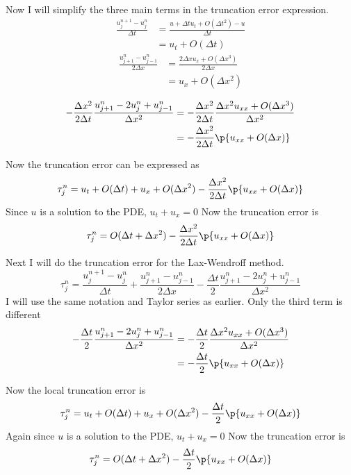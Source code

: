 \documentclass[11pt, oneside]{article}
\begin{document}
\begin{enumerate}
    Now I will simplify the three main terms in the truncation error expression.
    \begin{align*}
      \frac{u_j^{n+1} - u_j^n}{\Delta t} &= \frac{u + \Delta t u_t + O(\Delta t^2) - u}{\Delta t} \\
      &= u_t + O(\Delta t)
    \end{align*}
    \begin{align*}
      \frac{u_{j+1}^n - u_{j-1}^n}{2\Delta x} &= \frac{2\Delta x u_x + O(\Delta x^3)}{2\Delta x} \\
      &= u_x + O(\Delta x^2) \\
    \end{align*}
    \begin{align*}
      -\frac{\Delta x^2}{2 \Delta t} \frac{u_{j+1}^n - 2u_j^n + u_{j-1}^n}{\Delta x^2} &= -\frac{\Delta x^2}{2 \Delta t} \frac{\Delta x^2 u_{xx} + O(\Delta x^3)}{\Delta x^2} \\
      &= -\frac{\Delta x^2}{2 \Delta t} \p{u_{xx} + O(\Delta x)} \\
    \end{align*}

    Now the truncation error can be expressed as
    \[
      \tau_j^n = u_t + O(\Delta t) + u_x + O(\Delta x^2) - \frac{\Delta x^2}{2 \Delta t} \p{u_{xx} + O(\Delta x)}
    \]
    Since $u$ is a solution to the PDE, $u_t + u_x = 0$
    Now the truncation error is
    \[
      \tau_j^n =  O(\Delta t + \Delta x^2) - \frac{\Delta x^2}{2 \Delta t} \p{u_{xx} + O(\Delta x)}
    \]

    Next I will do the truncation error for the Lax-Wendroff method.
    \[
      \tau_j^n = \frac{u_j^{n+1} - u_j^n}{\Delta t}
      + \frac{u_{j+1}^n - u_{j-1}^n}{2\Delta x}
      - \frac{\Delta t}{2} \frac{u_{j+1}^n - 2u_j^n + u_{j-1}^n}{\Delta x^2}
    \]
    I will use the same notation and Taylor series as earlier.
    Only the third term is different
    \begin{align*}
      -\frac{\Delta t}{2} \frac{u_{j+1}^n - 2u_j^n + u_{j-1}^n}{\Delta x^2} &= -\frac{\Delta t}{2} \frac{\Delta x^2 u_{xx} + O(\Delta x^3)}{\Delta x^2} \\
      &= -\frac{\Delta t}{2} \p{u_{xx} + O(\Delta x)}
    \end{align*}

    Now the local truncation error is
    \[
      \tau_j^n = u_t + O(\Delta t) + u_x + O(\Delta x^2) -\frac{\Delta t}{2} \p{u_{xx} + O(\Delta x)}
    \]
    Again since $u$ is a solution to the PDE, $u_t + u_x = 0$
    Now the truncation error is
    \[
      \tau_j^n = O(\Delta t + \Delta x^2) -\frac{\Delta t}{2} \p{u_{xx} + O(\Delta x)}
    \]


\end{enumerate}
\end{document}
